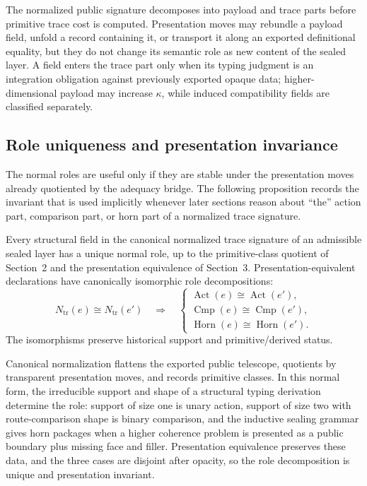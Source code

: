\documentclass{lmcs}
\begin{document}
The normalized public signature decomposes into payload and trace parts before primitive trace
cost is computed.  Presentation moves may rebundle a payload field, unfold a record containing
it, or transport it along an exported definitional equality, but they do not change its semantic
role as new content of the sealed layer.  A field enters the trace part only when its typing
judgment is an integration obligation against previously exported opaque data; higher-dimensional
payload may increase \(\kappa\), while induced compatibility fields are classified separately.

\subsection{Role uniqueness and presentation invariance}

The normal roles are useful only if they are stable under the presentation moves already
quotiented by the adequacy bridge.  The following proposition records the invariant that is
used implicitly whenever later sections reason about ``the'' action part, comparison part, or
horn part of a normalized trace signature.

\begin{prop}
Every structural field in the canonical normalized trace signature of an admissible sealed
layer has a unique normal role, up to the primitive-class quotient of Section~2 and the
presentation equivalence of Section~3.  Presentation-equivalent declarations have canonically
isomorphic role decompositions:
\[
  N_{\mathrm{tr}}(e)
  \cong
  N_{\mathrm{tr}}(e')
  \quad\Longrightarrow\quad
  \begin{cases}
    \operatorname{Act}(e) \cong \operatorname{Act}(e'),\\
    \operatorname{Cmp}(e) \cong \operatorname{Cmp}(e'),\\
    \operatorname{Horn}(e) \cong \operatorname{Horn}(e').
  \end{cases}
\]
The isomorphisms preserve historical support and primitive/derived status.
\end{prop}

Canonical normalization flattens the exported public telescope, quotients by transparent
presentation moves, and records primitive classes.  In this normal form, the irreducible
support and shape of a structural typing derivation determine the role: support of size one is
unary action, support of size two with route-comparison shape is binary comparison, and the
inductive sealing grammar gives horn packages when a higher coherence problem is presented as
a public boundary plus missing face and filler.  Presentation equivalence preserves these data,
and the three cases are disjoint after opacity, so the role decomposition is unique and
presentation invariant.
\end{document}
